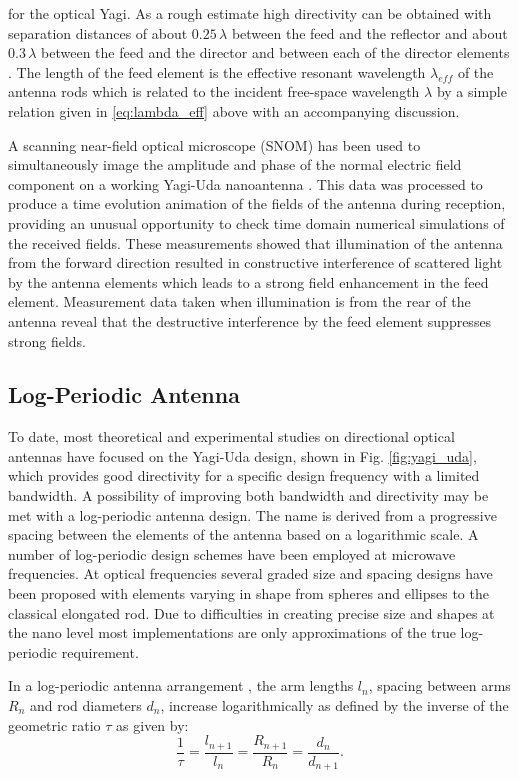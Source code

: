 \cite{Hofmann2007} for the optical Yagi. As a rough estimate high directivity can be obtained with separation distances of about $0.25\, \lambda$ between the feed and the reflector and about $0.3\, \lambda$ between the feed and the director and between each of the director elements \cite{Kosako2010}. The length of the feed element is the effective resonant wavelength $\lambda_{eff}$ of the antenna rods which is related to the incident free-space wavelength $\lambda$ by a simple relation given in \eqref{eq:lambda_eff} above with an accompanying discussion.

A scanning near-field optical microscope (SNOM) has been used to simultaneously image the amplitude and phase of the normal electric field component on a working Yagi-Uda nanoantenna \cite{Dorfmuller2011}. This data was processed to produce a time evolution animation of the fields of the antenna during reception, providing an unusual opportunity to check time domain numerical simulations of the received fields. These measurements showed that illumination of the antenna from the forward direction resulted in constructive interference of scattered light by the antenna elements which leads to a strong field enhancement in the feed element. Measurement data taken when illumination is from the rear of the antenna reveal that the destructive interference by the feed element suppresses strong fields.
\subsection{Log-Periodic Antenna}
%
To date, most theoretical and experimental studies on directional optical antennas have focused on the Yagi-Uda design, shown in Fig. \ref{fig:yagi_uda}, which provides good directivity for a specific design frequency with a limited bandwidth. A possibility of improving both bandwidth and directivity may be met with a log-periodic antenna design. The name is derived from a progressive spacing between the elements of the antenna based on a logarithmic scale. A number of log-periodic design schemes have been employed at microwave frequencies. At optical frequencies several graded size and spacing designs have been proposed with elements varying in shape from spheres and ellipses to the classical elongated rod. Due to difficulties in creating precise size and shapes at the nano level most implementations are only approximations of the true log-periodic requirement.

In a log-periodic antenna arrangement \cite{Balanis2015}, the arm lengths $l_n$, spacing between arms $R_n$ and rod diameters $d_n$, increase logarithmically as defined by the inverse of the geometric ratio $\tau$ as given by:
%
\begin{equation}
  \frac{1}{\tau} = \frac{l_{n + 1}}{l_n} = \frac{R_{n + 1}}{R_n} = \frac{d_n}{d_{n + 1}}.
  \label{eq:logperiodic}
\end{equation}

